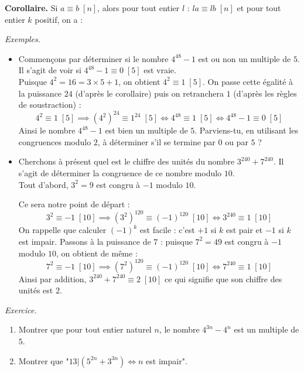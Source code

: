 \documentclass[11pt,class=report,crop=false]{standalone}
\begin{document}
\bigskip

\textbf{Corollaire.} 
Si $a \equiv b \; [n]$, alors pour tout entier $l$ : $la\equiv lb \; [n]$
et pour tout entier $k$ positif, on a : 



\emph{Exemples.}

\begin{itemize}
    \item Commençons par déterminer si le nombre $4^{48}-1$ est ou non un multiple de $5$.\\
    Il s'agit de voir si $4^{48}-1 \equiv 0 \; [5]$ est vraie.\\
    Puisque $4^2=16=3\times5+1$, on obtient $4^2\equiv 1\;[5]$. On passe cette égalité à la puissance $24$ (d'après le corollaire) puis on retranchera $1$ (d'après les règles de soustraction) :
    $$ 4^2 \equiv 1 \;[5] \implies (4^2)^{24} \equiv 1^{24} \; [5] \iff 4^{48} \equiv 1 \; [5] \iff 4^{48}-1 \equiv 0 \;[5] $$
    Ainsi le nombre $4^{48}-1$ est bien un multiple de $5$. Parviens-tu, en utilisant les congruences modulo $2$, à déterminer s’il se termine par $0$ ou par $5$ ?
    
    \item Cherchons à présent quel est le chiffre des unités du nombre $3^{240}+7^{240}$. Il s'agit de déterminer la congruence de ce nombre modulo $10$.\\
    Tout d'abord, $3^2=9$ est congru à $-1$ modulo $10$. 
    
    Ce sera notre point de départ :
    $$ 3^2 \equiv -1 \; [10] \implies (3^2)^{120}\equiv (-1)^{120} \; [10] \iff 3^{240} \equiv 1 \; [10] $$
    On rappelle que calculer $(-1)^k$ est facile : c'est $+1$ si $k$ est pair et $-1$ si $k$ est impair.
    Passons à la puissance de $7$ : puisque $7^2=49$ est congru à $-1$ modulo $10$, on obtient de même :
    $$ 7^2 \equiv -1 \; [10] \implies (7^2)^{120}\equiv (-1)^{120} \; [10] \iff 7^{240} \equiv 1 \; [10]$$
    Ainsi par addition, $3^{240}+7^{240} \equiv 2 \; [10]$ ce qui signifie que son chiffre des unités est $2$.
\end{itemize}    

\bigskip

\emph{Exercice.}
\begin{enumerate}
    \item Montrer que pour tout entier naturel $n$, le nombre $4^{3n}-4^n$ est un multiple de $5$.
    
    \item Montrer que "$13 | (5^{2n}+3^{3n}) \iff n$ est impair".
\end{enumerate}    
    
\end{document}
